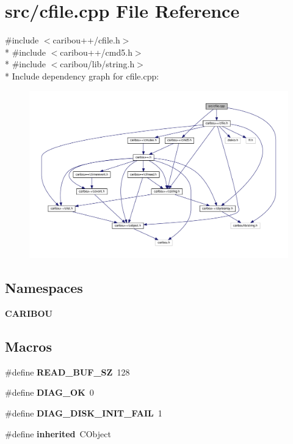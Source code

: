 \section{src/cfile.cpp File Reference}
\label{cfile_8cpp}
{\ttfamily \#include $<$caribou++/cfile.\+h$>$}\\*
{\ttfamily \#include $<$caribou++/cmd5.\+h$>$}\\*
{\ttfamily \#include $<$caribou/lib/string.\+h$>$}\\*
Include dependency graph for cfile.\+cpp\+:
\nopagebreak
\begin{figure}[H]
\begin{center}
\leavevmode
\includegraphics[width=350pt]{cfile_8cpp__incl}
\end{center}
\end{figure}
\subsection*{Namespaces}
\begin{DoxyCompactItemize}
\item 
 {\bf C\+A\+R\+I\+B\+OU}
\end{DoxyCompactItemize}
\subsection*{Macros}
\begin{DoxyCompactItemize}
\item 
\#define {\bf R\+E\+A\+D\+\_\+\+B\+U\+F\+\_\+\+SZ}~128
\item 
\#define {\bf D\+I\+A\+G\+\_\+\+OK}~0
\item 
\#define {\bf D\+I\+A\+G\+\_\+\+D\+I\+S\+K\+\_\+\+I\+N\+I\+T\+\_\+\+F\+A\+IL}~1
\item 
\#define {\bf inherited}~C\+Object
\end{DoxyCompactItemize}
